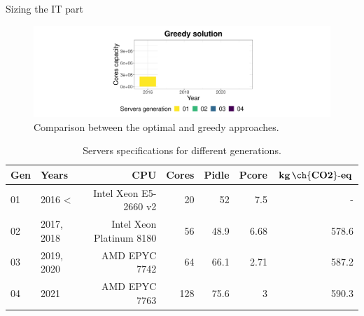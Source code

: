 \documentclass[Ligatures=TeX,table,svgnames,usetotalslideindicator,compress,10pt,aspectratio=169]{beamer}
\begin{document}
\begin{frame}{Sizing the IT part}
  \begin{center}
    \begin{figure}[h]    
      \centering
      \includegraphics[width=.9\textwidth]{images/cloud_federation_evolution_lifetime_year1.png}
      \caption{Comparison between the optimal and greedy approaches.}
    \end{figure}    
  \end{center}  

  \begin{table}[h]
  \tiny
  \label{tab:servers_specs} 
  \caption{Servers specifications for different generations.} \centering
  \begin{tabular}{|l|l|r|r|r|r|r|}
  \hline    
  \textbf{Gen} & \textbf{Years} & \textbf{CPU} &   \textbf{Cores} & \textbf{Pidle}  & \textbf{Pcore}  & \textbf{$\mathbf{kg\,\ch{CO2}\text{-}eq}$}  \\
  \hline
  01      &  2016 < & Intel Xeon E5-2660 v2 & 20 & 52 & 7.5  & -   \\
  \hline
  02 & 2017, 2018 & Intel Xeon Platinum 8180 & 56 & 48.9 & 6.68  & 578.6   \\
  \hline
  03   & 2019, 2020 & AMD EPYC 7742  & 64 & 66.1 & 2.71  & 587.2 \\
  \hline
  04   & 2021      & AMD EPYC 7763 & 128 & 75.6 & 3     & 590.3 \\
  \hline
  
\end{tabular}  
\end{table}

\end{frame}

\addtocounter{framenumber}{-1}
\end{document}
